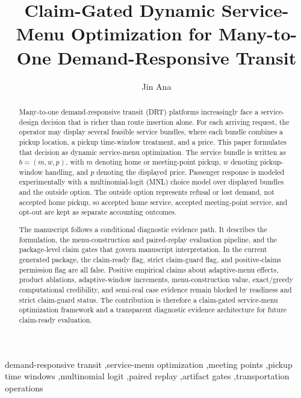 \documentclass[a4paper,fleqn,review]{cas-dc}
\begin{document}
\let\WriteBookmarks\relax
\def\floatpagepagefraction{1}
\def\textpagefraction{.001}


\title[mode=title]{Claim-Gated Dynamic Service-Menu Optimization for Many-to-One Demand-Responsive Transit}

\author[1]{Jin Ana}


\begin{abstract}
Many-to-one demand-responsive transit (DRT) platforms increasingly face a
service-design decision that is richer than route insertion alone. For each
arriving request, the operator may display several feasible service bundles,
where each bundle combines a pickup location, a pickup time-window treatment,
and a price. This paper formulates that decision as dynamic service-menu
optimization. The service bundle is written as $b=(m,w,p)$, with $m$ denoting
home or meeting-point pickup, $w$ denoting pickup-window handling, and $p$
denoting the displayed price. Passenger response is modeled experimentally
with a multinomial-logit (MNL) choice model over displayed bundles and the
outside option. The outside option represents refusal or lost demand, not
accepted home pickup, so accepted home service, accepted meeting-point service,
and opt-out are kept as separate accounting outcomes.

The manuscript follows a conditional diagnostic evidence path. It describes
the formulation, the menu-construction and paired-replay evaluation pipeline,
and the package-level claim gates that govern manuscript interpretation. In
the current generated package, the claim-ready flag, strict claim-guard flag,
and positive-claims permission flag are all false. Positive empirical claims
about adaptive-menu effects, product ablations, adaptive-window increments,
menu-construction value, exact/greedy computational credibility, and semi-real
case evidence remain blocked by readiness and strict claim-guard status. The
contribution is therefore a claim-gated service-menu optimization framework
and a transparent diagnostic evidence architecture for future claim-ready
evaluation.
\end{abstract}

\begin{keywords}
demand-responsive transit \sep service-menu optimization \sep meeting points \sep pickup time windows \sep multinomial logit \sep paired replay \sep artifact gates \sep transportation operations
\end{keywords}
\end{document}
